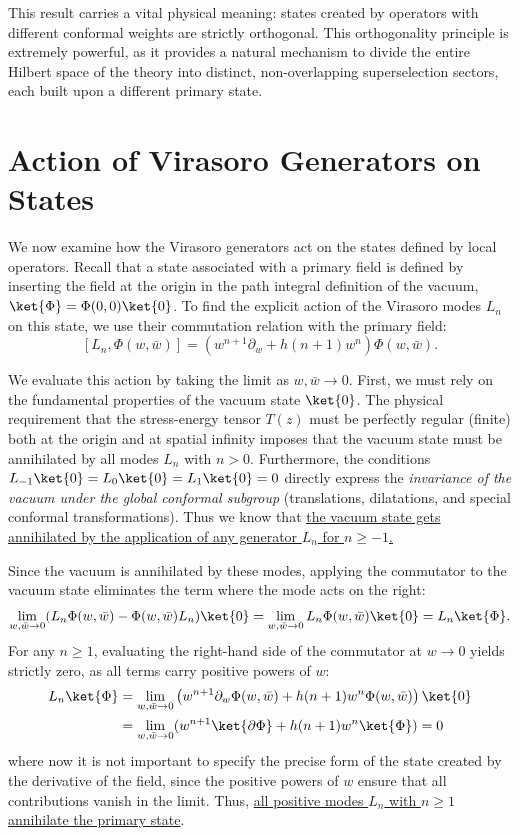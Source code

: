 This result carries a vital physical meaning: states created by operators with different conformal weights are strictly orthogonal. This orthogonality principle is extremely powerful, as it provides a natural mechanism to divide the entire Hilbert space of the theory into distinct, non-overlapping superselection sectors, each built upon a different primary state.

\section{Action of Virasoro Generators on States}

We now examine how the Virasoro generators act on the states defined by local operators. Recall that a state associated with a primary field is defined by inserting the field at the origin in the path integral definition of the vacuum, \(\ket{\Phi} = \Phi(0,0)\ket{0}\). To find the explicit action of the Virasoro modes \(L_n\) on this state, we use their commutation relation with the primary field:
\[
    [L_n, \Phi(w,\bar{w})] = (w^{n+1}\partial_w + h(n+1)w^n)\Phi(w,\bar{w}).
\]

We evaluate this action by taking the limit as \(w, \bar{w} \to 0\). First, we must rely on the fundamental properties of the vacuum state \(\ket{0}\). The physical requirement that the stress-energy tensor \(T(z)\) must be perfectly regular (finite) both at the origin and at spatial infinity imposes that the vacuum state must be annihilated by all modes \(L_n\) with \(n > 0\). Furthermore, the conditions \(L_{-1}\ket{0} = L_0\ket{0} = L_1\ket{0} = 0\) directly express the \textit{invariance of the vacuum under the global conformal subgroup} (translations, dilatations, and special conformal transformations). Thus we know that \uline{the vacuum state gets annihilated by the application of any generator \(L_n\) for \(n \geq -1\).}

Since the vacuum is annihilated by these modes, applying the commutator to the vacuum state eliminates the term where the mode acts on the right:
\[
    \lim_{w, \bar{w} \to 0} (L_n \Phi(w,\bar{w}) - \Phi(w,\bar{w}) L_n) \ket{0} = \lim_{w, \bar{w} \to 0} L_n \Phi(w,\bar{w}) \ket{0} = L_n \ket{\Phi}.
\]
For any \(n \ge 1\), evaluating the right-hand side of the commutator at \(w \to 0\) yields strictly zero, as all terms carry positive powers of \(w\):
\[
    \begin{aligned}
        L_n \ket{\Phi} & = \lim_{w, \bar{w} \to 0} \left( w^{n+1} \partial_w \Phi(w,\bar{w}) + h(n+1)w^n \Phi(w,\bar{w}) \right) \ket{0} \\
                       & = \lim_{w, \bar{w} \to 0} (w^{n+1} \ket{\partial \Phi} + h(n+1)w^n \ket{\Phi}) = 0
    \end{aligned}
\]
where now it is not important to specify the precise form of the state created by the derivative of the field, since the positive powers of \(w\) ensure that all contributions vanish in the limit. Thus, \uline{all positive modes \(L_n\) with \(n \ge 1\) annihilate the primary state}.

